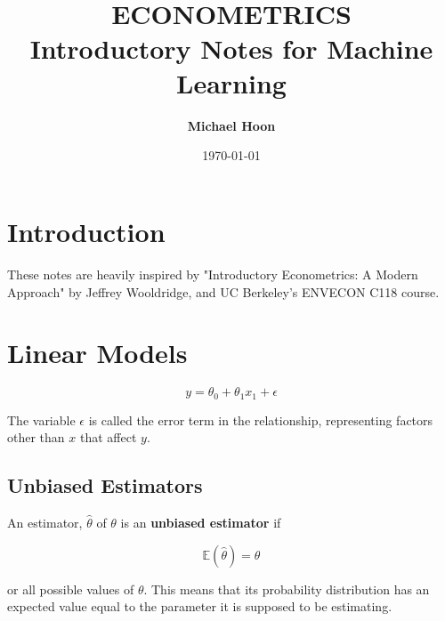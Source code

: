 \documentclass{article}
\begin{document}

\title{ \normalsize \textsc{}
		\\ [2.0cm]
		\HRule{1.5pt} \\
		\LARGE \textbf{\uppercase{Econometrics}
		\HRule{2.0pt} \\ [0.6cm] \LARGE{Introductory Notes for Machine Learning} \vspace*{10\baselineskip}}
		}
\date{\today}
\author{\textbf{Michael Hoon}}

\maketitle
\newpage

\tableofcontents
\newpage



\section{Introduction}
These notes are heavily inspired by "Introductory Econometrics: A Modern Approach" by Jeffrey Wooldridge, and UC Berkeley's ENVECON C118 course. 

\section{Linear Models}

\begin{equation}
    y = \theta_0 + \theta_1 x_{1} + \epsilon
\end{equation}

\noindent The variable $\epsilon$ is called the error term in the relationship, representing factors other than $x$ that affect $y$. 

\subsection{Unbiased Estimators}
An estimator, $\hat{\theta}$ of $\theta$ is an \textbf{unbiased estimator} if 

\begin{equation}
    \mathbb{E}(\hat{\theta}) = \theta
\end{equation}

\noindent or all possible values of $\theta$. This means that its probability distribution has an expected value equal to the parameter it is supposed to be estimating. 
\end{document}
